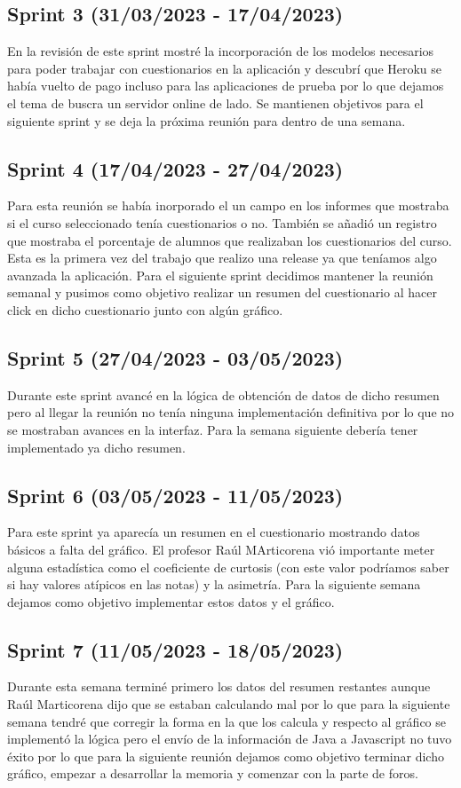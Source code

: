 \subsection{Sprint 3 (31/03/2023 - 17/04/2023)}
	En la revisión de este sprint mostré la incorporación de los modelos necesarios para poder trabajar con cuestionarios en la aplicación y descubrí que Heroku se había vuelto de pago incluso para las aplicaciones de prueba por lo que dejamos el tema de buscra un servidor online de lado. Se mantienen objetivos para el siguiente sprint y se deja la próxima reunión para dentro de una semana.

\subsection{Sprint 4 (17/04/2023 - 27/04/2023)}
	Para esta reunión se había inorporado el un campo en los informes que mostraba si el curso seleccionado tenía cuestionarios o no. También se añadió un registro que mostraba el porcentaje de alumnos que realizaban los cuestionarios del curso. Esta es la primera vez del trabajo que realizo una release ya que teníamos algo avanzada la aplicación. Para el siguiente sprint decidimos mantener la reunión semanal y pusimos como objetivo realizar un resumen del cuestionario al hacer click en dicho cuestionario junto con algún gráfico.

\subsection{Sprint 5 (27/04/2023 - 03/05/2023)}
	Durante este sprint avancé en la lógica de obtención de datos de dicho resumen pero al llegar la reunión no tenía ninguna implementación definitiva por lo que no se mostraban avances en la interfaz. Para la semana siguiente debería tener implementado ya dicho resumen.

\subsection{Sprint 6 (03/05/2023 - 11/05/2023)}
	Para este sprint ya aparecía un resumen en el cuestionario mostrando datos básicos a falta del gráfico. El profesor Raúl MArticorena vió importante meter alguna estadística como el coeficiente de curtosis (con este valor podríamos saber si hay valores atípicos en las notas) y la asimetría. Para la siguiente semana dejamos como objetivo implementar estos datos y el gráfico.

\subsection{Sprint 7 (11/05/2023 - 18/05/2023)}
	Durante esta semana terminé primero los datos del resumen restantes aunque Raúl Marticorena dijo que se estaban calculando mal por lo que para la siguiente semana tendré que corregir la forma en la que los calcula y respecto al gráfico se implementó la lógica pero el envío de la información de Java a Javascript no tuvo éxito por lo que para la siguiente reunión dejamos como objetivo terminar dicho gráfico, empezar a desarrollar la memoria y comenzar con la parte de foros.

